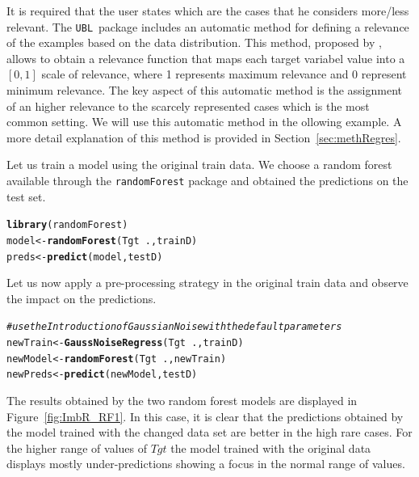 \documentclass[10pt,a4paper]{article}\usepackage[]{graphicx}\usepackage[]{color}
\makeatletter
\newcommand{\hlcom}[1]{\textcolor[rgb]{0.678,0.584,0.686}{\textit{#1}}}%
\newcommand{\hlopt}[1]{\textcolor[rgb]{0,0,0}{#1}}%
\newcommand{\hlstd}[1]{\textcolor[rgb]{0.345,0.345,0.345}{#1}}%
\newcommand{\hlkwb}[1]{\textcolor[rgb]{0.69,0.353,0.396}{#1}}%
\newcommand{\hlkwd}[1]{\textcolor[rgb]{0.737,0.353,0.396}{\textbf{#1}}}%
\newenvironment{kframe}{%
 \def\at@end@of@kframe{}%
 \ifinner\ifhmode%
  \def\at@end@of@kframe{\end{minipage}}%
  \begin{minipage}{\columnwidth}%
 \fi\fi%
 \def\FrameCommand##1{\hskip\@totalleftmargin \hskip-\fboxsep
 \colorbox{shadecolor}{##1}\hskip-\fboxsep
     \hskip-\linewidth \hskip-\@totalleftmargin \hskip\columnwidth}%
 \MakeFramed {\advance\hsize-\width
   \@totalleftmargin\z@ \linewidth\hsize
   \@setminipage}}%
 {\par\unskip\endMakeFramed%
 \at@end@of@kframe}
\newenvironment{knitrout}{}{} %
\newcommand{\UBLp}{\texttt{UBL}\ package  }
\makeatother
\begin{document}
It is required that the user states which are the cases that he considers more/less relevant. The \UBLp includes an automatic method for defining a relevance of the examples based on the data distribution. This method, proposed by \cite{ribeiro2011utility}, allows to obtain a relevance function that maps each target variabel value into a $[0,1]$ scale of relevance, where 1 represents maximum relevance and 0 represent minimum relevance. The key aspect of this automatic method is the assignment of an higher relevance to the scarcely represented cases which is the most common setting. We will use this automatic method in the ollowing example. A more detail explanation of this method is provided in Section~\ref{sec:methRegres}.


Let us train a model using the original train data. We choose a random forest available through the \texttt{randomForest} package and obtained the predictions on the test set.

\begin{knitrout}\footnotesize
{}\color{fgcolor}\begin{kframe}
\begin{alltt}
\hlkwd{library}\hlstd{(randomForest)}
\hlstd{model} \hlkwb{<-} \hlkwd{randomForest}\hlstd{(Tgt}\hlopt{~}\hlstd{., trainD)}
\hlstd{preds} \hlkwb{<-} \hlkwd{predict}\hlstd{(model, testD)}
\end{alltt}
\end{kframe}
\end{knitrout}

Let us now apply a pre-processing strategy in the original train data and observe the impact on the predictions.

\begin{knitrout}\footnotesize
{}\color{fgcolor}\begin{kframe}
\begin{alltt}
\hlcom{# use the Introduction of Gaussian Noise with the default parameters}
\hlstd{newTrain} \hlkwb{<-} \hlkwd{GaussNoiseRegress}\hlstd{(Tgt}\hlopt{~}\hlstd{., trainD)}
\hlstd{newModel} \hlkwb{<-}\hlkwd{randomForest}\hlstd{(Tgt}\hlopt{~}\hlstd{., newTrain)}
\hlstd{newPreds} \hlkwb{<-} \hlkwd{predict}\hlstd{(newModel, testD)}
\end{alltt}
\end{kframe}
\end{knitrout}

The results obtained by the two random forest models are displayed in Figure~\ref{fig:ImbR_RF1}. In this case, it is clear that the predictions obtained by the model trained with the changed data set are better in the high rare cases. For the higher range of values of $Tgt$ the model trained with the original data displays mostly under-predictions showing a focus in the normal range of values.
\end{document}
